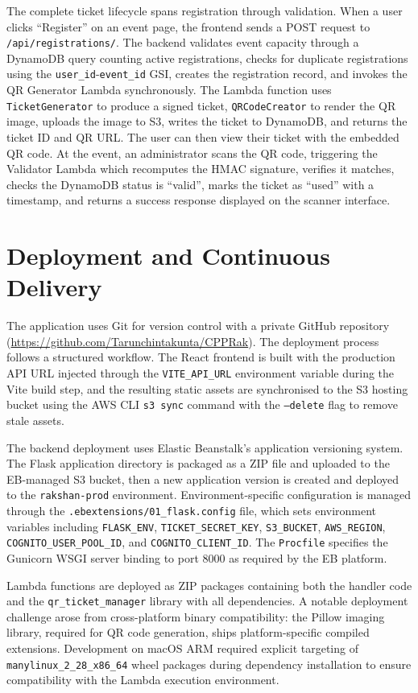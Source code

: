 \documentclass[conference]{IEEEtran}
\begin{document}
The complete ticket lifecycle spans registration through validation. When a user clicks ``Register'' on an event page, the frontend sends a POST request to \texttt{/api/registrations/}. The backend validates event capacity through a DynamoDB query counting active registrations, checks for duplicate registrations using the \texttt{user\_id}-\texttt{event\_id} GSI, creates the registration record, and invokes the QR Generator Lambda synchronously. The Lambda function uses \texttt{TicketGenerator} to produce a signed ticket, \texttt{QRCodeCreator} to render the QR image, uploads the image to S3, writes the ticket to DynamoDB, and returns the ticket ID and QR URL. The user can then view their ticket with the embedded QR code. At the event, an administrator scans the QR code, triggering the Validator Lambda which recomputes the HMAC signature, verifies it matches, checks the DynamoDB status is ``valid'', marks the ticket as ``used'' with a timestamp, and returns a success response displayed on the scanner interface.

\section{Deployment and Continuous Delivery}

The application uses Git for version control with a private GitHub repository (\url{https://github.com/Tarunchintakunta/CPPRak}). The deployment process follows a structured workflow. The React frontend is built with the production API URL injected through the \texttt{VITE\_API\_URL} environment variable during the Vite build step, and the resulting static assets are synchronised to the S3 hosting bucket using the AWS CLI \texttt{s3 sync} command with the \texttt{--delete} flag to remove stale assets.

The backend deployment uses Elastic Beanstalk's application versioning system. The Flask application directory is packaged as a ZIP file and uploaded to the EB-managed S3 bucket, then a new application version is created and deployed to the \texttt{rakshan-prod} environment. Environment-specific configuration is managed through the \texttt{.ebextensions/01\_flask.config} file, which sets environment variables including \texttt{FLASK\_ENV}, \texttt{TICKET\_SECRET\_KEY}, \texttt{S3\_BUCKET}, \texttt{AWS\_REGION}, \texttt{COGNITO\_USER\_POOL\_ID}, and \texttt{COGNITO\_CLIENT\_ID}. The \texttt{Procfile} specifies the Gunicorn WSGI server binding to port 8000 as required by the EB platform.

Lambda functions are deployed as ZIP packages containing both the handler code and the \texttt{qr\_ticket\_manager} library with all dependencies. A notable deployment challenge arose from cross-platform binary compatibility: the Pillow imaging library, required for QR code generation, ships platform-specific compiled extensions. Development on macOS ARM required explicit targeting of \texttt{manylinux\_2\_28\_x86\_64} wheel packages during dependency installation to ensure compatibility with the Lambda execution environment.
\end{document}
